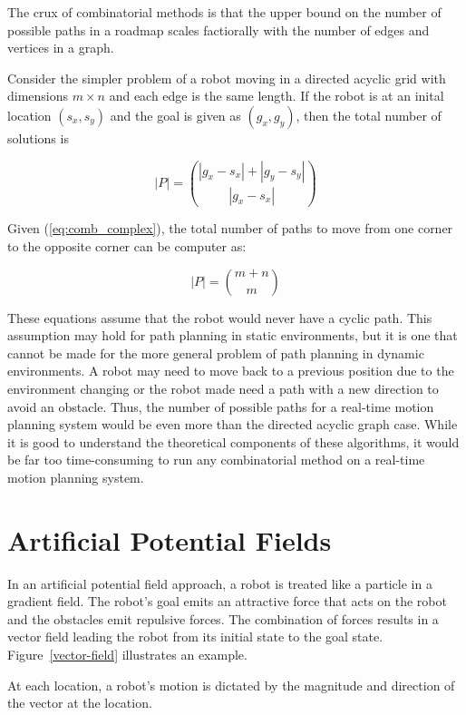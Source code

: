 \documentclass[10pt,conference]{ieeeconf}
\begin{document}
The crux of combinatorial methods is that the upper bound on the number of possible paths in a roadmap scales factiorally with the number of edges and vertices in a graph. 

Consider the simpler problem of a robot moving in a directed acyclic grid with dimensions $m \times n$ and each edge is the same length. If the robot is at an inital location $(s_x, s_y)$ and the goal is given as $(g_x, g_y)$, then the total number of solutions is 

\begin{equation}\label{eq:comb_complex}
|P| = { |g_x-s_x|+|g_y-s_y| \choose |g_x-s_x| }
\end{equation}

Given (\ref{eq:comb_complex}), the total number of paths to move from one corner to the opposite corner can be computer as:

\begin{equation}
|P| = {m+n \choose m}
\end{equation}

These equations assume that the robot would never have a cyclic path. This assumption may hold for path planning in static environments, but it is one that cannot be made for the more general problem of path planning in dynamic environments. A robot may need to move back to a previous position due to the environment changing or the robot made need a path with a new direction to avoid an obstacle. Thus, the number of possible paths for a real-time motion planning system would be even more than the directed acyclic graph case. While it is good to understand the theoretical components of these algorithms, it would be far too time-consuming to run any combinatorial method on a real-time motion planning system. 




\section{Artificial Potential Fields}

In an artificial potential field approach, a robot is treated like a particle in a gradient field. The robot's goal emits an attractive force that acts on the robot and the obstacles emit repulsive forces. The combination of forces results in a vector field leading the robot from its initial state to the goal state. Figure~\ref{vector-field} illustrates an example.

At each location, a robot's motion is dictated by the magnitude and direction of the vector at the location.
\end{document}
